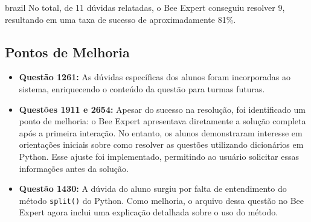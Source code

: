 \begin{otherlanguage*}{brazil}
No total, de 11 dúvidas relatadas, o Bee Expert conseguiu resolver 9, resultando em uma taxa de sucesso de aproximadamente 81\%.  

\subsection{Pontos de Melhoria}  

\begin{itemize}  
    \item \textbf{Questão 1261:} As dúvidas específicas dos alunos foram incorporadas ao sistema, enriquecendo o conteúdo da questão para turmas futuras.  
    \item \textbf{Questões 1911 e 2654:} Apesar do sucesso na resolução, foi identificado um ponto de melhoria: o Bee Expert apresentava diretamente a solução completa após a primeira interação. No entanto, os alunos demonstraram interesse em orientações iniciais sobre como resolver as questões utilizando dicionários em Python. Esse ajuste foi implementado, permitindo ao usuário solicitar essas informações antes da solução.  
    \item \textbf{Questão 1430:} A dúvida do aluno surgiu por falta de entendimento do método \texttt{split()} do Python. Como melhoria, o arquivo dessa questão no Bee Expert agora inclui uma explicação detalhada sobre o uso do método.  
\end{itemize}  

\end{otherlanguage*}


